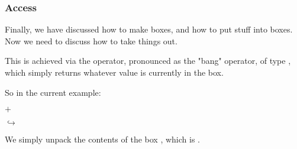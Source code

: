 \documentclass[aspectratio=169, handout]{beamer}
\begin{document}
\begin{frame}[fragile]
  \frametitle{ Access}

  Finally, we have discussed how to make boxes, and how to put stuff into boxes.
  Now we need to discuss how to take things out.

  \pause
  \vspace{\fill}

  This is achieved via the \code{!} operator, pronounced as the "bang" operator,
  of type , which simply returns whatever value is currently
  in the box.

  \pause
  \vspace{\fill}

  So in the current example:

  \begin{center}
    \begin{minipage}{0.15\textwidth}
      \centering
    \end{minipage}
    \begin{minipage}{0.1\textwidth}
      \centering
      $+$
    \end{minipage}
    \begin{minipage}{0.15\textwidth}
      \centering
    \end{minipage}
    \begin{minipage}{0.1\textwidth}
      \centering
      $\hookrightarrow$
    \end{minipage}
    \begin{minipage}{0.15\textwidth}
      \centering
    \end{minipage}
  \end{center}

  \pause
  \vspace{\fill}

  We simply unpack the contents of the box , which is .
\end{frame}
\end{document}
